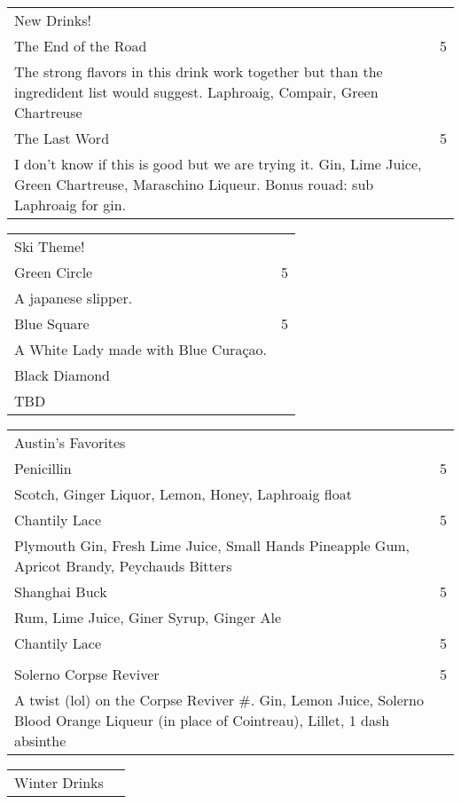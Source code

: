 \documentclass[12pt]{article}
\makeatletter
\newcommand*\ColText[1]{\textcolor{Goldenrod3}{#1}}
\newenvironment{Group}[1]
  {\noindent\begin{tabular*}{\textwidth}{@{}p{.8\linewidth}@{\extracolsep{\fill}}r@{}}
    {\fontsize{24}{29}\selectfont\ColText{#1}}\\[0.8em]}
  {\end{tabular*}}
\newcommand*\Entry[2]{%
  \sffamily#1 & #2}
\newcommand*\Expl[1]{
  \hspace*{1em}\footnotesize #1}
\makeatother
\begin{document}
\begin{Group}{New Drinks!}
\Entry{The End of the Road}{5} \\
\Expl{The strong flavors in this drink work together but than the ingredident list would suggest. Laphroaig, Compair, Green Chartreuse} \\
\Entry{The Last Word}{5} \\
\Expl{I don't know if this is good but we are trying it. Gin, Lime Juice, Green Chartreuse, Maraschino Liqueur. Bonus rouad: sub Laphroaig for gin.} \\
\end{Group}

\vfill

\begin{Group}{Ski Theme!}
\Entry{Green Circle}{5} \\
\Expl{A japanese slipper.} \\
\Entry{Blue Square}{5} \\
\Expl{A White Lady made with Blue Curaçao.} \\
\Entry{Black Diamond} \\
\Expl{TBD} \\
\end{Group}

\vfill

\begin{Group}{Austin's Favorites}
\Entry{Penicillin}{5} \\
\Expl{Scotch, Ginger Liquor, Lemon, Honey, Laphroaig float} \\
\Entry{Chantily Lace}{5} \\
\Expl{Plymouth Gin, Fresh Lime Juice, Small Hands Pineapple Gum, Apricot Brandy, Peychauds Bitters} \\
\Entry{Shanghai Buck}{5} \\
\Expl{Rum, Lime Juice, Giner Syrup, Ginger Ale} \\
\Entry{Chantily Lace}{5} \\
\Expl{} \\
\Entry{Solerno Corpse Reviver}{5} \\
\Expl{A twist (lol) on the Corpse Reviver \#. Gin, Lemon Juice, Solerno Blood Orange Liqueur (in place of Cointreau), Lillet, 1 dash absinthe} \\
\end{Group}

\vfill

\begin{Group}{Winter Drinks}
\end{Group}
\end{document}

